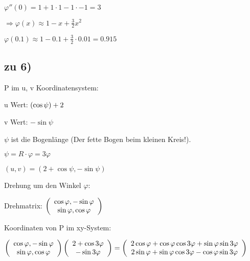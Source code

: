 $ \varphi''(0) = 1 + 1 \cdot 1 - 1 \cdot - 1 = 3$

$\Rightarrow \varphi(x) \approx 1 - x + \frac{3}{2} x^2 $

$ \varphi(0.1) \approx 1 - 0.1 + \frac{3}{2} \cdot 0.01 = 0.915 $

\subsection{zu 6)}
P im u, v Koordinatensystem: 

u Wert: $ \left( \cos \psi \right)  + 2$ 

v Wert: $ - \sin \psi$

$\psi$ ist die Bogenlänge (Der fette Bogen beim kleinen Kreis!).

$\psi = R \cdot \varphi = 3 \varphi$

$(u,v) = (2 + \cos \psi, -\sin \psi)$

Drehung um den Winkel $\varphi$: 

Drehmatrix: $  \left(  \begin{array}{c} \cos \varphi, -\sin \varphi\\\sin \varphi, \cos \varphi \end{array}  \right)  $

Koordinaten von P im xy-System:
 
$   \left(  \begin{array}{c} \cos \varphi, -\sin \varphi\\\sin \varphi, \cos \varphi \end{array}  \right)     \left(  \begin{array}{c} 2 + \cos 3 \varphi\\-\sin 3\varphi \end{array}  \right)  
=   \left(  \begin{array}{c} 2\cos \varphi + \cos \varphi \cos 3 \varphi + \sin \varphi \sin 3 \varphi\\2\sin \varphi + \sin \varphi \cos 3 \varphi - \cos \varphi \sin 3 \varphi \end{array}  \right)  
$

